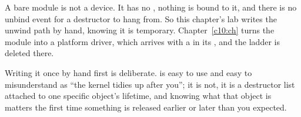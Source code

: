 \noindent A bare module is not a device. It has no , nothing is bound to it, and
there is no unbind event for a destructor to hang from. So this chapter's lab writes the unwind
path by hand, knowing it is temporary. Chapter~\ref{c10:ch} turns the module into a platform
driver, which arrives with a  in its , and the ladder is deleted
there.

Writing it once by hand first is deliberate.  is easy to use and easy to misunderstand
as ``the kernel tidies up after you''; it is not, it is a destructor list attached to one specific
object's lifetime, and knowing what that object is matters the first time something is released
earlier or later than you expected.
